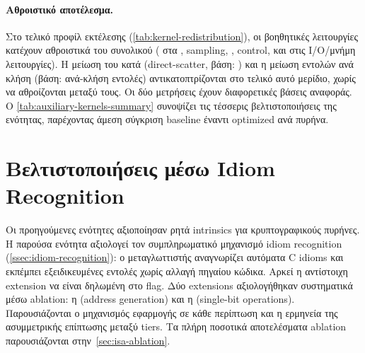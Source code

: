 
\paragraph{Αθροιστικό αποτέλεσμα.}
Στο τελικό προφίλ εκτέλεσης
(\cref{tab:kernel-redistribution}), οι βοηθητικές λειτουργίες κατέχουν
αθροιστικά  του συνολικού \instret ( στα
, sampling, , control, και  στις
I/O/μνήμη λειτουργίες). Η μείωση του \Encaps \instret κατά 
(direct-scatter, βάση: \Encaps) και η  μείωση εντολών ανά
κλήση  (βάση: ανά-κλήση εντολές) αντικατοπτρίζονται στο
τελικό αυτό μερίδιο, χωρίς να αθροίζονται μεταξύ τους. Οι δύο μετρήσεις
έχουν διαφορετικές βάσεις αναφοράς. Ο \cref{tab:auxiliary-kernels-summary}
συνοψίζει τις τέσσερις βελτιστοποιήσεις της ενότητας, παρέχοντας
άμεση σύγκριση baseline έναντι optimized ανά πυρήνα.

\begin{table}[htbp]
  \centering
  \caption{Σύνοψη βελτιστοποιήσεων βοηθητικών πυρήνων (HQC-128,
           \VLEN{}=\num{256}). Οι στήλες /
           αναφέρονται σε iterations ή εντολές ανά κλήση, βλ.~υποσημείωση
           για λεπτομέρειες. Το αποτέλεσμα 
           εκφράζεται ως $\Delta$~\Encaps \instret. Το αποτέλεσμα μνήμης
           ως $\Delta$~\KEM \instret.}
  \label{tab:auxiliary-kernels-summary}
  
\end{table}
\fi

\ifTODO
\section{Βελτιστοποιήσεις μέσω Idiom Recognition}
\label{sec:idiom-recognition-hqc}

Οι προηγούμενες ενότητες αξιοποίησαν ρητά intrinsics για κρυπτογραφικούς
πυρήνες. Η παρούσα ενότητα αξιολογεί τον συμπληρωματικό μηχανισμό
idiom recognition (\cf \cref{ssec:idiom-recognition}): ο μεταγλωττιστής
αναγνωρίζει αυτόματα C idioms και εκπέμπει εξειδικευμένες εντολές χωρίς
αλλαγή πηγαίου κώδικα. Αρκεί η αντίστοιχη extension να είναι δηλωμένη
στο  flag. Δύο extensions αξιολογήθηκαν συστηματικά μέσω
ablation: η  (address generation) και η  (single-bit
operations). Παρουσιάζονται ο μηχανισμός εφαρμογής σε κάθε περίπτωση και
η ερμηνεία της ασυμμετρικής επίπτωσης μεταξύ tiers. Τα πλήρη
ποσοτικά αποτελέσματα ablation παρουσιάζονται στην~\cref{sec:isa-ablation}.

